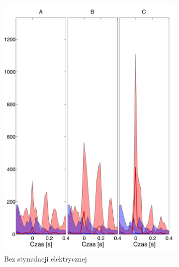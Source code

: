 \documentclass{pracamgr}
\begin{document}
	\begin{figure}[h]
		\begin{subfigure}{.5\textwidth}
			\centering
			\includegraphics[width=1.\linewidth]{kontrola15_10-30_z_SC6_do_CxC102.png}
			\caption{Bez stymulacji elektrycznej}
			\label{rys:10_30_kon_SC_CxC}
		\end{subfigure}%
		\begin{subfigure}{.5\textwidth}
			\centering

\end{subfigure}
\end{figure}
\end{document}
